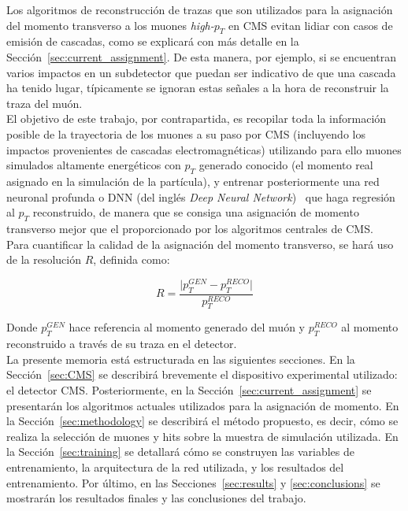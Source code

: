 Los algoritmos de reconstrucci\'on de trazas que son utilizados para la asignaci\'on del momento transverso a los muones \textit{high-$p_{T}$} en CMS evitan lidiar con casos de emisi\'on de cascadas, como se explicar\'a con m\'as detalle en la Secci\'on~\ref{sec:current_assignment}. De esta manera, por ejemplo, si se encuentran varios impactos en un subdetector que puedan ser indicativo de que una cascada ha tenido lugar, t\'ipicamente se ignoran estas se\~nales a la hora de reconstruir la traza del mu\'on. \\
El objetivo de este trabajo, por contrapartida, es recopilar toda la informaci\'on posible de la trayectoria de los muones a su paso por CMS (incluyendo los impactos provenientes de cascadas electromagn\'eticas) utilizando para ello muones simulados altamente energ\'eticos con $p_{T}$ generado conocido (el momento real asignado en la simulaci\'on de la partícula), y entrenar posteriormente una red neuronal profunda o DNN (del ingl\'es \textit{Deep Neural Network})~\cite{Schmidhuber:2015} que haga regresi\'on al $p_{T}$ reconstruido, de manera que se consiga una asignaci\'on de momento transverso mejor que el proporcionado por los algoritmos centrales de CMS. \\

Para cuantificar la calidad de la asignaci\'on del momento transverso, se har\'a uso de la resoluci\'on $R$, definida como:

\begin{equation}
  R = \dfrac{\lvert p_{T}^{GEN} - p_{T}^{RECO}\rvert}{p_{T}^{RECO}}
\label{eq:R}
\end{equation}

Donde $p_{T}^{GEN}$ hace referencia al momento generado del mu\'on y $p_{T}^{RECO}$ al momento reconstruido a trav\'es de su traza en el detector. \\

La presente memoria est\'a estructurada en las siguientes secciones. En la Secci\'on~\ref{sec:CMS} se describir\'a brevemente el dispositivo experimental utilizado: el detector CMS. Posteriormente, en la Secci\'on~\ref{sec:current_assignment} se presentar\'an los algoritmos actuales utilizados para la asignaci\'on de momento. En la Secci\'on~\ref{sec:methodology} se describir\'a el m\'etodo propuesto, es decir, c\'omo se realiza la selecci\'on de muones y hits sobre la muestra de simulaci\'on utilizada. En la Secci\'on~\ref{sec:training} se detallar\'a c\'omo se construyen las variables de entrenamiento, la arquitectura de la red utilizada, y los resultados del entrenamiento. Por \'ultimo, en las Secciones~\ref{sec:results} y \ref{sec:conclusions} se mostrar\'an los resultados finales y las conclusiones del trabajo.
